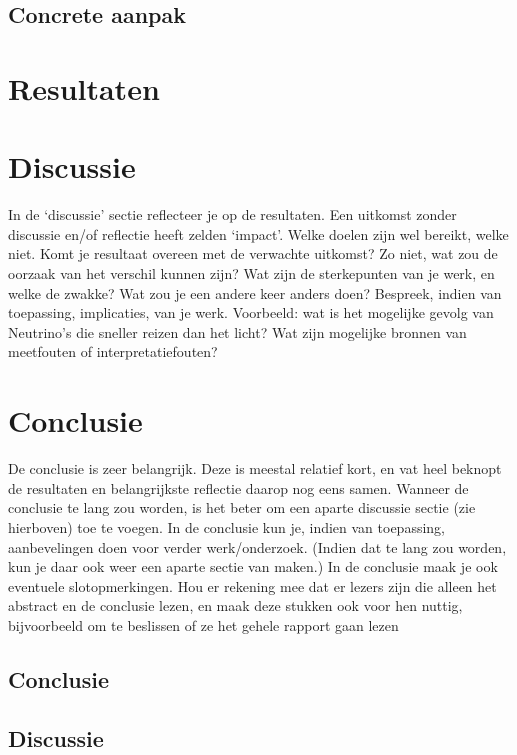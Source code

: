 \documentclass{report}
\begin{document}
\section{Concrete aanpak}

\chapter{Resultaten}




\chapter {Discussie}
In de ‘discussie’ sectie reﬂecteer je op de resultaten. Een uitkomst zonder discussie en/of reﬂectie
heeft zelden ‘impact’. Welke doelen zijn wel bereikt, welke niet. Komt je resultaat overeen met de
verwachte uitkomst? Zo niet, wat zou de oorzaak van het verschil kunnen zijn? Wat zijn de sterkepunten van je werk, en welke de zwakke? Wat zou je een andere keer anders doen? Bespreek, indien
van toepassing, implicaties, van je werk. Voorbeeld: wat is het mogelijke gevolg van Neutrino’s die
sneller reizen dan het licht? Wat zijn mogelijke bronnen van meetfouten of interpretatiefouten?

\chapter{Conclusie}
De conclusie is zeer belangrijk. Deze is meestal relatief kort, en vat heel beknopt de resultaten en
belangrijkste reﬂectie daarop nog eens samen. Wanneer de conclusie te lang zou worden, is het beter
om een aparte discussie sectie (zie hierboven) toe te voegen. In de conclusie kun je, indien van
toepassing, aanbevelingen doen voor verder werk/onderzoek. (Indien dat te lang zou worden, kun je
daar ook weer een aparte sectie van maken.) In de conclusie maak je ook eventuele slotopmerkingen.
Hou er rekening mee dat er lezers zijn die alleen het abstract en de conclusie lezen, en maak deze
stukken ook voor hen nuttig, bijvoorbeeld om te beslissen of ze het gehele rapport gaan lezen

\section{Conclusie}

\section{Discussie}
\end{document}
